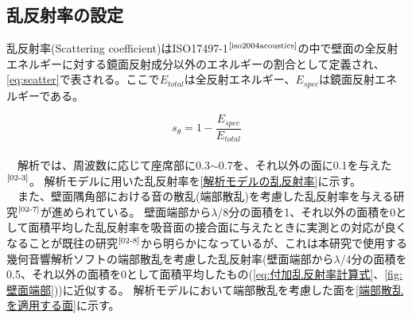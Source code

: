 \subsection{乱反射率の設定}
乱反射率(Scattering coefficient)はISO17497-1$^{\text{\cite{iso2004acoustics}}}$の中で壁面の全反射エネルギーに対する鏡面反射成分以外のエネルギーの割合として定義され、\ref{eq:scatter}で表される。ここで$E_{total}$は全反射エネルギー、$E_{spec}$は鏡面反射エネルギーである。

\begin{equation}
 \label{eq:scatter}
s_{\theta}=1-\frac{E_{spec}}{E_{total}}
\end{equation}
\\　解析では、周波数に応じて座席部に0.3$\sim$0.7を、それ以外の面に0.1を与えた$^{\text{\cite{02-3}}}$。
解析モデルに用いた乱反射率を\ref{解析モデルの乱反射率}に示す。\\
　また、壁面隅角部における音の散乱(端部散乱)を考慮した乱反射率を与える研究$^{\text{\cite{02-7}}}$が進められている。
壁面端部から$\lambda$/8分の面積を1、それ以外の面積を0として面積平均した乱反射率を吸音面の接合面に与えたときに実測との対応が良くなることが既往の研究$^{\text{\cite{02-8}}}$から明らかになっているが、これは本研究で使用する幾何音響解析ソフトの端部散乱を考慮した乱反射率(壁面端部から$\lambda$/4分の面積を0.5、それ以外の面積を0として面積平均したもの(\ref{eq:付加乱反射率計算式}、\ref{fig:壁面端部}))に近似する。
解析モデルにおいて端部散乱を考慮した面を\ref{端部散乱を適用する面}に示す。
\begin{table}[htbp]
\centering
\caption{解析モデルの乱反射率}
\label{解析モデルの乱反射率}
\end{table}

